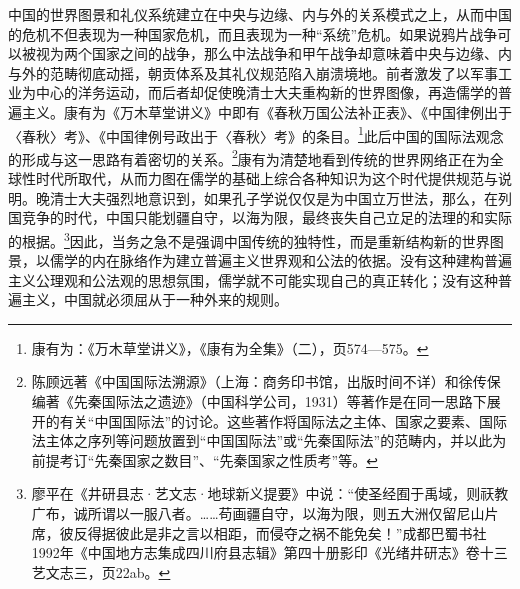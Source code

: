 \documentclass[a4paper, 12pt, openright]{ctexbook}
\begin{document}
中国的世界图景和礼仪系统建立在中央与边缘、内与外的关系模式之上，从而中国的危机不但表现为一种国家危机，而且表现为一种“系统”危机。如果说鸦片战争可以被视为两个国家之间的战争，那么中法战争和甲午战争却意味着中央与边缘、内与外的范畴彻底动摇，朝贡体系及其礼仪规范陷入崩溃境地。前者激发了以军事工业为中心的洋务运动，而后者却促使晚清士大夫重构新的世界图像，再造儒学的普遍主义。康有为《万木草堂讲义》中即有《春秋万国公法补正表》、《中国律例出于〈春秋〉考》、《中国律例号政出于〈春秋〉考》的条目。\footnote{康有为：《万木草堂讲义》，《康有为全集》（二），页574—575。}此后中国的国际法观念的形成与这一思路有着密切的关系。\footnote{陈顾远著《中国国际法溯源》（上海：商务印书馆，出版时间不详）和徐传保编著《先秦国际法之遗迹》（中国科学公司，1931）等著作是在同一思路下展开的有关“中国国际法”的讨论。这些著作将国际法之主体、国家之要素、国际法主体之序列等问题放置到“中国国际法”或“先秦国际法”的范畴内，并以此为前提考订“先秦国家之数目”、“先秦国家之性质考”等。}康有为清楚地看到传统的世界网络正在为全球性时代所取代，从而力图在儒学的基础上综合各种知识为这个时代提供规范与说明。晚清士大夫强烈地意识到，如果孔子学说仅仅是为中国立万世法，那么，在列国竞争的时代，中国只能划疆自守，以海为限，最终丧失自己立足的法理的和实际的根据。\footnote{廖平在《井研县志·艺文志·地球新义提要》中说：“使圣经囿于禹域，则祆教广布，诚所谓以一服八者。……苟画疆自守，以海为限，则五大洲仅留尼山片席，彼反得据彼此是非之言以相距，而侵夺之祸不能免矣！”成都巴蜀书社1992年《中国地方志集成四川府县志辑》第四十册影印《光绪井研志》卷十三艺文志三，页22ab。}因此，当务之急不是强调中国传统的独特性，而是重新结构新的世界图景，以儒学的内在脉络作为建立普遍主义世界观和公法的依据。没有这种建构普遍主义公理观和公法观的思想氛围，儒学就不可能实现自己的真正转化；没有这种普遍主义，中国就必须屈从于一种外来的规则。
\end{document}
